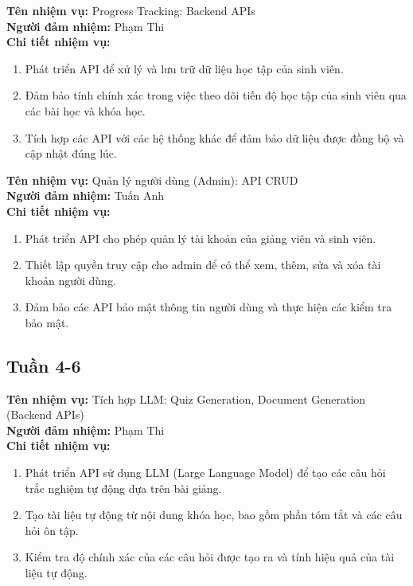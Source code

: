 \noindent \textbf{Tên nhiệm vụ:} Progress Tracking: Backend APIs \\
\noindent \textbf{Người đảm nhiệm:} Phạm Thi \\
\noindent \textbf{Chi tiết nhiệm vụ:} 
\begin{enumerate}[label=-]
    \item Phát triển API để xử lý và lưu trữ dữ liệu học tập của sinh viên. 
    \item Đảm bảo tính chính xác trong việc theo dõi tiến độ học tập của sinh viên qua các bài học và khóa học. 
    \item Tích hợp các API với các hệ thống khác để đảm bảo dữ liệu được đồng bộ và cập nhật đúng lúc.
\end{enumerate}

\noindent \textbf{Tên nhiệm vụ:} Quản lý người dùng (Admin): API CRUD \\
\noindent \textbf{Người đảm nhiệm:} Tuấn Anh \\
\noindent \textbf{Chi tiết nhiệm vụ:} 
\begin{enumerate}[label=-]
    \item Phát triển API cho phép quản lý tài khoản của giảng viên và sinh viên. 
    \item Thiết lập quyền truy cập cho admin để có thể xem, thêm, sửa và xóa tài khoản người dùng. 
    \item Đảm bảo các API bảo mật thông tin người dùng và thực hiện các kiểm tra bảo mật.
\end{enumerate}

\subsection*{Tuần 4-6}

\noindent \textbf{Tên nhiệm vụ:} Tích hợp LLM: Quiz Generation, Document Generation (Backend APIs) \\
\noindent \textbf{Người đảm nhiệm:} Phạm Thi \\
\noindent \textbf{Chi tiết nhiệm vụ:} 
\begin{enumerate}[label=-]
    \item Phát triển API sử dụng LLM (Large Language Model) để tạo các câu hỏi trắc nghiệm tự động dựa trên bài giảng. 
    \item Tạo tài liệu tự động từ nội dung khóa học, bao gồm phần tóm tắt và các câu hỏi ôn tập. 
    \item Kiểm tra độ chính xác của các câu hỏi được tạo ra và tính hiệu quả của tài liệu tự động.
\end{enumerate}

